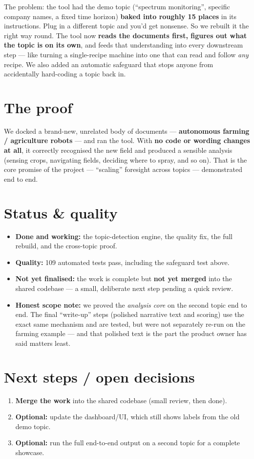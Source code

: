 \documentclass[11pt,a4paper]{article}
\begin{document}
The problem: the tool had the demo topic (``spectrum monitoring'', specific company names, a
fixed time horizon) \textbf{baked into roughly 15 places} in its instructions. Plug in a
different topic and you'd get nonsense. So we rebuilt it the right way round. The tool now
\textbf{reads the documents first, figures out what the topic is on its own}, and feeds that
understanding into every downstream step --- like turning a single-recipe machine into one that
can read and follow \emph{any} recipe. We also added an automatic safeguard that stops anyone
from accidentally hard-coding a topic back in.

\section{The proof}
We docked a brand-new, unrelated body of documents --- \textbf{autonomous farming / agriculture
robots} --- and ran the tool. With \textbf{no code or wording changes at all}, it correctly
recognised the new field and produced a sensible analysis (sensing crops, navigating fields,
deciding where to spray, and so on). That is the core promise of the project --- ``scaling''
foresight across topics --- demonstrated end to end.

\section{Status \& quality}
\begin{itemize}
  \item \textbf{Done and working:} the topic-detection engine, the quality fix, the full
        rebuild, and the cross-topic proof.
  \item \textbf{Quality:} 109 automated tests pass, including the safeguard test above.
  \item \textbf{Not yet finalised:} the work is complete but \textbf{not yet merged} into the
        shared codebase --- a small, deliberate next step pending a quick review.
  \item \textbf{Honest scope note:} we proved the \emph{analysis core} on the second topic end to
        end. The final ``write-up'' steps (polished narrative text and scoring) use the exact same
        mechanism and are tested, but were not separately re-run on the farming example --- and
        that polished text is the part the product owner has said matters least.
\end{itemize}

\section{Next steps / open decisions}
\begin{enumerate}
  \item \textbf{Merge the work} into the shared codebase (small review, then done).
  \item \textbf{Optional:} update the dashboard/UI, which still shows labels from the old demo topic.
  \item \textbf{Optional:} run the full end-to-end output on a second topic for a complete showcase.
\end{enumerate}
\end{document}
